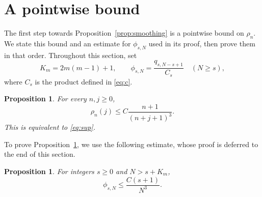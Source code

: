 \documentclass[11pt,letterpaper,reqno]{amsart}
\numberwithin{equation}{section}
\theoremstyle{plain}
\newtheorem{proposition}[theorem]{Proposition}
\theoremstyle{remark}
\begin{document}
\section{A pointwise bound}\label{sec:pointwise}
The first step towards Proposition~\ref{prop:smoothing} is a pointwise bound on $\rho_n$.
%
We state this bound and an estimate for $\phi_{s,N}$ used in its proof, then prove them in that order.
%
Throughout this section, set
\[
 K_m=2m(m-1)+1,\qquad
 \phi_{s,N}=\frac{q_{s,N-s+1}}{C_s}\quad(N\ge s),
\]
where $C_s$ is the product defined in \eqref{eq:c}.

\begin{proposition}\label{prop:pointwise}
For every $n,j\ge0$,
\begin{equation}\label{eq:pointwise}
 \rho_n(j)\le C\frac{n+1}{(n+j+1)^3}.
\end{equation}
This is equivalent to \eqref{eq:sup}.
\end{proposition}

To prove Proposition~\ref{prop:pointwise}, we use the following estimate, whose proof is deferred to the end of this section.
\begin{proposition}\label{prop:far}
For integers $s\ge0$ and $N>s+K_m$,
\begin{equation}\label{eq:far}
 \phi_{s,N}\le\frac{C(s+1)}{N^3}.
\end{equation}
\end{proposition}
\end{document}
